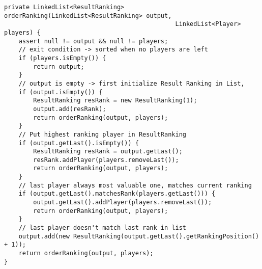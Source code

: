 \begin{lstlisting}[float,style=CodeHighlighting,caption=Result - orderRanking,label=lst:result_orderRanking]
private LinkedList<ResultRanking> orderRanking(LinkedList<ResultRanking> output,
                                               LinkedList<Player> players) {
    assert null != output && null != players;
    // exit condition -> sorted when no players are left
    if (players.isEmpty()) {
        return output;
    }
    // output is empty -> first initialize Result Ranking in List,
    if (output.isEmpty()) {
        ResultRanking resRank = new ResultRanking(1);
        output.add(resRank);
        return orderRanking(output, players);
    }
    // Put highest ranking player in ResultRanking
    if (output.getLast().isEmpty()) {
        ResultRanking resRank = output.getLast();
        resRank.addPlayer(players.removeLast());
        return orderRanking(output, players);
    }
    // last player always most valuable one, matches current ranking
    if (output.getLast().matchesRank(players.getLast())) {
        output.getLast().addPlayer(players.removeLast());
        return orderRanking(output, players);
    }
    // last player doesn't match last rank in list
    output.add(new ResultRanking(output.getLast().getRankingPosition() + 1));
    return orderRanking(output, players);
}
\end{lstlisting}
